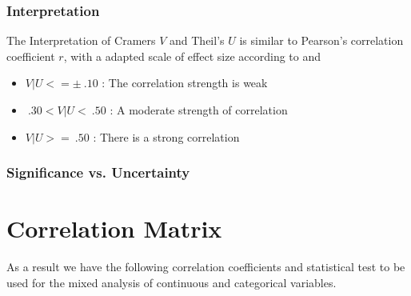 \documentclass[a4paper,12pt]{report}
\begin{document}
\subsubsection{Interpretation}

The Interpretation of Cramers $V$ and Theil's $U$ is similar to Pearson's correlation coefficient $r$, with a adapted scale of effect size according to \cite{Cohen1988} and \cite{Ellis2010}

\begin{itemize}
	\item $V|U <= \pm \: .10$ : The correlation strength is weak
	\item $\: .30 < V|U < \: .50$ : A moderate strength of correlation
	\item $V|U >= \: .50$ : There is a strong correlation
\end{itemize}

\subsubsection{Significance vs. Uncertainty}
\label{correlation_significance_uncertainty}







\section{Correlation Matrix}

As a result we have the following correlation coefficients and statistical test to be used for the mixed analysis of continuous and categorical variables. 

\bigskip
\end{document}
